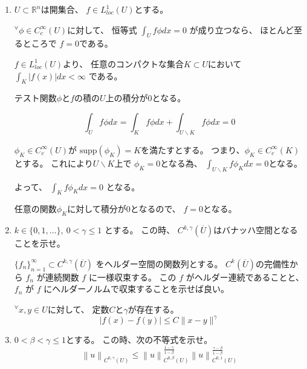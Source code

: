 \documentclass[12pt,b5paper]{ltjsarticle}
\begin{document}
\begin{enumerate}
 \item
      $U \subset \mathbb{R}^{n}$は開集合、
      $f\in L^{1}_{loc}(U)$とする。

      ${}^{\forall}\phi \in C^{\infty}_{c}(U)$に対して、
      恒等式
      $\int_{U}f\phi dx =0$
      が成り立つなら、
      ほとんど至るところで
      $f=0$である。

      \dotfill

      $f\in L^{1}_{loc}(U)$より、
      任意のコンパクトな集合$K \subset U$において
      $\int_{K}\lvert f(x) \rvert dx < \infty$
      である。

      テスト関数$\phi$と$f$の積の$U$上の積分が$0$となる。

      \begin{equation}
       \int_{U}f\phi dx
        =
        \int_{K}f\phi dx
        + \int_{U\backslash K}f\phi dx =0
      \end{equation}

      $\phi_{K}\in C^{\infty}_{c}(U)$が
      $\mathrm{supp}(\phi_{K})=K$を満たすとする。
      つまり、$\phi_{K}\in C^{\infty}_{c}(K)$とする。
      これにより$U\backslash K$上で $\phi_{K}=0$となる為、
      $\int_{U\backslash K}f\phi_{K} dx =0$となる。

      よって、
      $\int_{K}f\phi_{K} dx=0$
      となる。

      任意の関数$\phi_{K}$に対して積分が0となるので、
      $f=0$となる。

      

      \hrulefill
 \item
      $k\in \{ 0,1,\dots \},\: 0< \gamma \leq 1$
      とする。
      この時、
      $C^{k,\gamma}(\overline{U})$はバナッハ空間となることを示せ。

      \dotfill


      $\{f_n\}_{n=1}^{\infty} \subset C^{k,\gamma}(\overline{U})$
      をヘルダー空間の関数列とする。
      $C^{k}(\overline{U})$の完備性から $f_n$ が連続関数 $f$ に一様収束する。
      この $f$ がヘルダー連続であることと、
      $f_n$ が $f$ にヘルダーノルムで収束することを示せば良い。

      
      ${}^{\forall}x,y\in U$に対して、
      定数$C$と$\gamma$が存在する。
      \begin{equation}
       \lvert f(x)-f(y) \rvert \leq C \| x-y \|^{\gamma}
      \end{equation}



      \hrulefill
 \item
      $0 < \beta < \gamma \leq 1$とする。
      この時、次の不等式を示せ。
      \begin{equation}
       \left\| u \right\|_{C^{0,\gamma}(U)}
        \leq
        \left\| u \right\|_{C^{0,\beta}(U)}^{\frac{1-\gamma}{1-\beta}}
        \left\| u \right\|_{C^{0,1}(U)}^{\frac{\gamma-\beta}{1-\beta}}
      \end{equation}
      

\end{enumerate}
\end{document}
